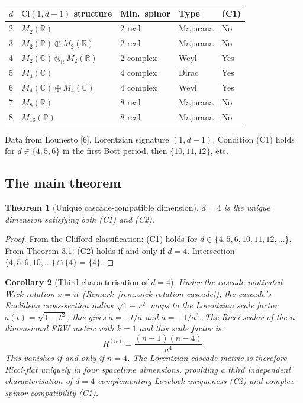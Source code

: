\documentclass[12pt,a4paper]{article}
\newtheorem{theorem}{Theorem}[section]
\newtheorem{corollary}[theorem]{Corollary}
\begin{document}
\begin{center}
\begin{tabular}{lllll}
\hline
$d$ & $\text{Cl}(1, d - 1)$ structure & Min.\ spinor & Type & (C1) \\
\hline
2 & $M_2(\mathbb{R})$ & 2 real & Majorana & No \\
3 & $M_2(\mathbb{R}) \oplus M_2(\mathbb{R})$ & 2 real & Majorana & No \\
4 & $M_2(\mathbb{C}) \otimes_\mathbb{R} M_2(\mathbb{R})$ & 2 complex & Weyl & Yes \\
5 & $M_4(\mathbb{C})$ & 4 complex & Dirac & Yes \\
6 & $M_4(\mathbb{C}) \oplus M_4(\mathbb{C})$ & 4 complex & Weyl & Yes \\
7 & $M_8(\mathbb{R})$ & 8 real & Majorana & No \\
8 & $M_{16}(\mathbb{R})$ & 8 real & Majorana & No \\
\hline
\end{tabular}
\end{center}

Data from Lounesto [6], Lorentzian signature $(1, d - 1)$. Condition (C1) holds for
$d \in \{4, 5, 6\}$ in the first Bott period, then $\{10, 11, 12\}$, etc.

\subsection{The main theorem}

\begin{theorem}[Unique cascade-compatible dimension]\label{thm:d4}
$d = 4$ is the unique dimension
satisfying both (C1) and (C2).
\end{theorem}

\begin{proof}
From the Clifford classification: (C1) holds for $d \in \{4, 5, 6, 10, 11, 12, \ldots\}$. From
Theorem 3.1: (C2) holds if and only if $d = 4$. Intersection: $\{4, 5, 6, 10, \ldots\} \cap \{4\} = \{4\}$.
\end{proof}

\begin{corollary}[Third characterisation of $d = 4$]\label{cor:ricci-flat}
Under the cascade-motivated Wick rotation $x = it$
(Remark~\ref{rem:wick-rotation-cascade}), the cascade's Euclidean
cross-section radius $\sqrt{1-x^2}$ maps to the Lorentzian scale
factor $a(t) = \sqrt{1 - t^2}$; this gives $\dot{a} = -t/a$ and
$\ddot{a} = -1/a^3$. The Ricci scalar of the $n$-dimensional FRW
metric with $k = 1$ and this scale factor is:
\[
R^{(n)} = \frac{(n - 1)(n - 4)}{a^4}.
\]
This vanishes if and only if $n = 4$. The Lorentzian cascade metric is therefore Ricci-flat
uniquely in four spacetime dimensions, providing a third independent characterisation of
$d = 4$ complementing Lovelock uniqueness (C2) and complex spinor compatibility (C1).
\end{corollary}
\end{document}

